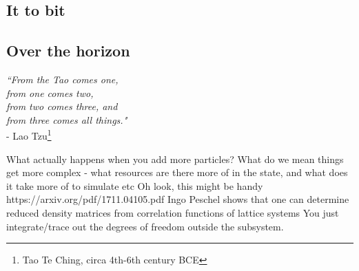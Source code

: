 \subsection*{It to bit}%
\subsection*{Over the horizon}%

\begin{adjustwidth}{3cm}{0cm}
\begin{flushright}
\emph{``From the Tao comes one,\\
from one comes two,\\
from two comes three, and\\
from three comes all things."}\\
 - Lao Tzu\footnote{Tao Te Ching, circa 4th-6th century BCE}
\end{flushright}
\end{adjustwidth}
    



	What actually happens when you add more particles? What do we mean things get more complex - what resources are there more of in the state, and what does it take more of to simulate etc
Oh look, this might be handy https://arxiv.org/pdf/1711.04105.pdf
	Ingo Peschel shows that one can determine reduced density matrices from correlation functions of lattice systems \cite{Peschel03} %
	You just integrate/trace out the degrees of freedom outside the subsystem.


